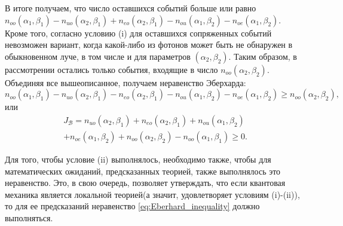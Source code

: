 \documentclass[%
master,         %
subf,           %
href,           %
,times         %
]{disser}
\numberwithin{equation}{section}
\numberwithin{figure}{section}
\begin{document}
В итоге получаем, что число оставшихся событий больше или равно $n_{oo}(\alpha_1, \beta_1) - n_{uo}(\alpha_2, \beta_1) + n_{eo}(\alpha_2, \beta_1) - n_{ou}(\alpha_1, \beta_2) - n_{oe}(\alpha_1, \beta_2)$. Кроме того, согласно условию (i) для оставшихся сопряженных событий невозможен вариант, когда какой-либо из фотонов может быть не обнаружен в обыкновенном луче, в том числе и для параметров $(\alpha_2, \beta_2)$. Таким образом, в рассмотрении остались только события, входящие в число $n_{oo}(\alpha_2, \beta_2)$. Объединяя все вышеописанное, получаем неравенство Эберхарда:
\[
n_{oo}(\alpha_1, \beta_1) - n_{uo}(\alpha_2, \beta_1) - n_{eo}(\alpha_2, \beta_1) - n_{ou}(\alpha_1, \beta_2) - n_{oe}(\alpha_1, \beta_2) \geq n_{oo}(\alpha_2, \beta_2),
\]
или
\begin{multline}
J_{\mathcal{B}} = n_{uo}(\alpha_2, \beta_1) + n_{eo}(\alpha_2, \beta_1) + n_{ou}(\alpha_1, \beta_2) \\
+ n_{oe}(\alpha_1, \beta_2) + n_{oo}(\alpha_2, \beta_2) - n_{oo}(\alpha_1, \beta_1) \geq 0.
\label{eq:Eberhard_inequality}
\end{multline}

Для того, чтобы условие (ii) выполнялось, необходимо также, чтобы для математических ожиданий, предсказанных теорией, также выполнялось это неравенство. Это, в свою очередь, позволяет утверждать, что если квантовая механика является локальной теорией(а значит, удовлетворяет условиям (i)-(ii)), то для ее предсказаний неравенство \eqref{eq:Eberhard_inequality} должно выполняться.
\end{document}
